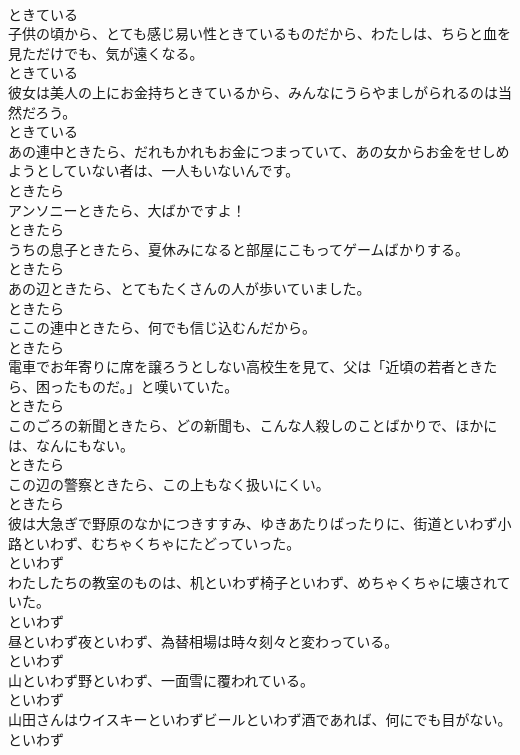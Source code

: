 \documentclass[8pt]{extreport}
\begin{document}
\begin{CJK}{UTF8}{min}
\\	ときている
\\	子供の頃から、とても感じ易い性ときているものだから、わたしは、ちらと血を見ただけでも、気が遠くなる。	
\\	ときている
\\	彼女は美人の上にお金持ちときているから、みんなにうらやましがられるのは当然だろう。	
\\	ときている
\\	あの連中ときたら、だれもかれもお金につまっていて、あの女からお金をせしめようとしていない者は、一人もいないんです。	
\\	ときたら
\\	アンソニーときたら、大ばかですよ！	
\\	ときたら
\\	うちの息子ときたら、夏休みになると部屋にこもってゲームばかりする。	
\\	ときたら
\\	あの辺ときたら、とてもたくさんの人が歩いていました。	
\\	ときたら
\\	ここの連中ときたら、何でも信じ込むんだから。	
\\	ときたら
\\	電車でお年寄りに席を譲ろうとしない高校生を見て、父は「近頃の若者ときたら、困ったものだ。」と嘆いていた。	
\\	ときたら
\\	このごろの新聞ときたら、どの新聞も、こんな人殺しのことばかりで、ほかには、なんにもない。	
\\	ときたら
\\	この辺の警察ときたら、この上もなく扱いにくい。	
\\	ときたら
\\	彼は大急ぎで野原のなかにつきすすみ、ゆきあたりばったりに、街道といわず小路といわず、むちゃくちゃにたどっていった。	
\\	といわず
\\	わたしたちの教室のものは、机といわず椅子といわず、めちゃくちゃに壊されていた。	
\\	といわず
\\	昼といわず夜といわず、為替相場は時々刻々と変わっている。	
\\	といわず
\\	山といわず野といわず、一面雪に覆われている。	
\\	といわず
\\	山田さんはウイスキーといわずビールといわず酒であれば、何にでも目がない。	
\\	といわず

\end{CJK}
\end{document}
